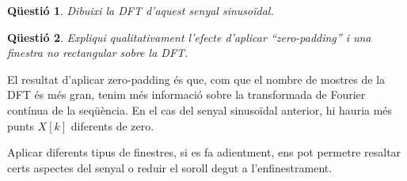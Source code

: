 \documentclass[11pt,a4]{article}
\numberwithin{equation}{section}
\theoremstyle{thmstyle}
\theoremstyle{thmstyle}
\theoremstyle{thmstyle}
\theoremstyle{thmstyle}
\theoremstyle{thmstyle}
\theoremstyle{thmstyle}
\newtheorem{question}{Qüestió}
\renewcommand{\ss}{\scriptstyle}
\begin{document}
\begin{question}
Dibuixi la DFT d'aquest senyal sinusoïdal.
\end{question}

\begin{figure}[ht]
\centering
\end{figure}

\begin{question}
Expliqui qualitativament l’efecte d’aplicar “zero-padding” i una finestra no rectangular sobre la DFT.
\end{question}
El resultat d'aplicar zero-padding és que, com que el nombre de mostres de la DFT és més gran, tenim més informació sobre la transformada de Fourier contínua de la seqüència. En el cas del senyal sinusoïdal anterior, hi hauria més punts $X[k]$ diferents de zero.

Aplicar diferents tipus de finestres, si es fa adientment, ens pot permetre resaltar certs aspectes del senyal o reduir el soroll degut a l'enfinestrament.
\end{document}
